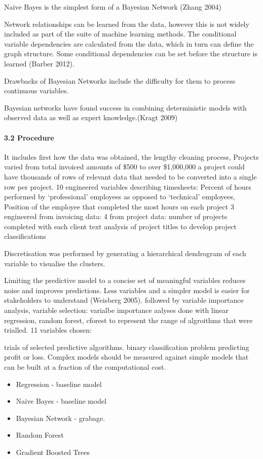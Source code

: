 \documentclass[]{elsarticle} %
\providecommand{\tightlist}{%
  \setlength{\itemsep}{0pt}\setlength{\parskip}{0pt}}
\begin{document}
Naive Bayes is the simplest form of a Bayesian Network (Zhang 2004)

Network relationships can be learned from the data, however this is not
widely included as part of the suite of machine learning methods. The
conditional variable dependencies are calculated from the data, which in
turn can define the graph structure. Some conditional dependencies can
be set before the structure is learned (Barber 2012).

Drawbacks of Bayesian Networks include the difficulty for them to
process continuous variables.

Bayesian networks have found success in combining deterministic models
with observed data as well as expert knowledge.(Kragt 2009)

\paragraph{3.2 Procedure}\label{procedure}

It includes first how the data was obtained, the lengthy cleaning
process, Projects varied from total invoiced amounts of \$500 to over
\$1,000,000 a project could have thousands of rows of relevant data that
needed to be converted into a single row per project. 10 engineered
variables describing timesheets: Percent of hours performed by
`professional' employees as opposed to `technical' employees, Position
of the employee that completed the most hours on each project 3
engineered from invoicing data: 4 from project data: number of projects
completed with each client text analysis of project titles to develop
project classifications

Discretisation was performed by generating a hierarchical dendrogram of
each variable to visualise the clusters.

Limiting the predictive model to a concise set of meaningful variables
reduces noise and improves predictions. Less variables and a simpler
model is easier for stakeholders to understand (Weisberg 2005). followed
by variable importance analysis, variable selection: varialbe importance
aalyses done with linear regression, random forest, cforest to represent
the range of algroithms that were trialled. 11 variables chosen:

trials of selected predictive algorithms. binary classification problem
predicting profit or loss. Complex models should be measured against
simple models that can be built at a fraction of the computational cost.

\begin{itemize}
\tightlist
\item
  Regression - baseline model
\item
  Naive Bayes - baseline model
\item
  Bayesian Network - grabage.
\item
  Random Forest
\item
  Gradient Boosted Trees
\end{itemize}
\end{document}
